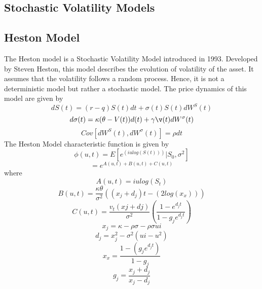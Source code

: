 \documentclass{article}
\begin{document}
\subsection{Stochastic Volatility Models}
\subsection{Heston Model}
The Heston model is a Stochastic Volatility Model introduced in 1993. Developed by Steven Heston, this model describes the evolution of volatility of the asset. It assumes that the volatility follows a random process. Hence, it is not a deterministic model but rather a stochastic model.
The price dynamics of this model are given by
\begin{equation}
dS(t) = (r- q)S(t)dt + \sigma(t)S(t)dW^S(t)
\end{equation}
\begin{equation}
d\sigma(t) = \kappa(\theta-V(t))d(t) + \gamma\v(t)dW^\sigma(t)
\end{equation}
\begin{equation}
Cov[dW^S(t), dW^\sigma(t)] = \rho dt
\end{equation}
The Heston Model characteristic function is given by
\begin{equation}
    \phi(u,t) = E[e^{(iulog(S(t)))}|S_{0}, \sigma^2]
\end{equation}
\begin{equation}
    = e^{A(u,t)+B(u,t)+C(u,t)}
\end{equation}
where
\begin{equation}
    A(u,t) = iulog(S_t)
\end{equation}
\begin{equation}
    B(u,t) = \frac{\kappa\theta}{\sigma^2}((x_j+d_j)t - (2log(x_x)) )
\end{equation}
\begin{equation}
    C(u,t) = \frac{v_t(xj+dj)}{\sigma^2} (\frac{1-e^{d_j t}}{ 1-g_je^{d_j t}})
\end{equation}
\begin{equation}
    x_j = \kappa-\rho\sigma-\rho\sigma ui
\end{equation}
\begin{equation}
    d_j = x_{j}^2 - \sigma^2(ui - u^2)
\end{equation}
\begin{equation}
    x_x = \frac{ 1-(g_j e^{d_j t})}{ 1-g_j}
\end{equation}
\begin{equation}
    g_j = \frac{x_j + d_j}{x_j - d_j}
\end{equation}
\end{document}
